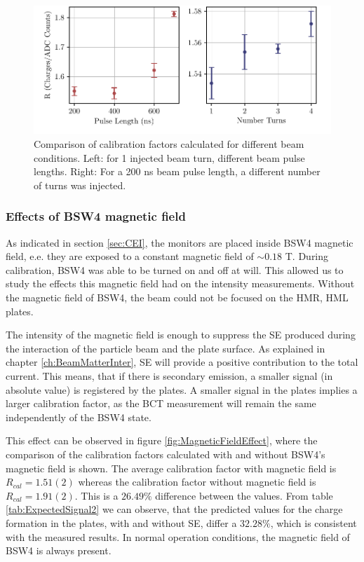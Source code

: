 \begin{figure}[h]
    \centering
    \includegraphics[width=1.0\columnwidth]{Figure_CalFactorLinearity/CalfacLin.pdf}
    \caption{Comparison of calibration factors calculated for different beam conditions.  Left: for 1 injected beam turn, different beam pulse lengths. Right: For a 200 ns beam pulse length, a different number of turns was injected. }
    \label{fig:CalfacPlenNturn}
\end{figure}


\subsubsection{Effects of BSW4 magnetic field}
\label{sec:SEBSW4}

As indicated in section \ref{sec:CEI}, the \hzhm monitors are placed inside BSW4 magnetic field, e.e. they are exposed to a constant magnetic field of $\sim 0.18 $ T. During calibration, BSW4 was able to be turned on and off at will. This allowed us to study the effects this magnetic field had on the intensity measurements. Without the magnetic field of BSW4, the beam could not be focused on the HMR, HML plates. 

The intensity of the magnetic field is enough to suppress the SE produced during the interaction of the particle beam and the plate surface. As explained in chapter \ref{ch:BeamMatterInter}, SE will provide a positive contribution to the total current. This means, that if there is secondary emission, a smaller signal (in absolute value) is registered by the plates. A smaller signal in the plates implies a larger calibration factor, as the BCT measurement will remain the same independently of the BSW4 state. 

This effect can be observed in figure \ref{fig:MagneticFieldEffect}, where the comparison of the calibration factors calculated with and without BSW4's magnetic field is shown. The average calibration factor with magnetic field is $R_{cal} = 1.51(2)$ whereas the calibration factor without magnetic field is $R_{cal} = 1.91(2)$. This is a $26.49 \%$ difference between the values. From table \ref{tab:ExpectedSignal2} we can observe, that the predicted values for the charge formation in the plates, with and without SE, differ a $32.28 \%$, which is consistent with the measured results. In normal operation conditions, the magnetic field of BSW4 is always present. 

